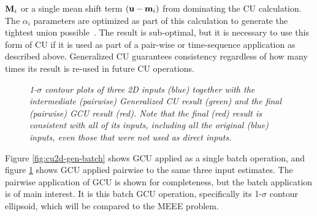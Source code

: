 $\mathbf{M}_i$ or a single mean shift term $(\mathbf{u}-\mathbf{m}_i)$ from dominating the CU calculation. The $\alpha_i$ parameters
are optimized as part of this calculation to generate the tightest union possible~\cite{fusion06}. The result is
sub-optimal, but it is necessary to use this form of CU if it is used as part of a pair-wise or time-sequence
application as described above.  Generalized CU guarantees consistency regardless of how many times its result is
re-used in future CU operations.
\begin{figure}[tbp]
    \centering
    \caption{\it 1-$\sigma$ contour plots of three 2D inputs (blue) together with the intermediate (pairwise) Generalized CU result
        (green) and the final (pairwise) GCU result (red). Note that the final (red) result is consistent with all of
        its inputs, including all the original (blue) inputs, even those that were not used as direct inputs.}
    \label{fig:cu2d-gen-s}
\end{figure}
Figure \ref{fig:cu2d-gen-batch} shows GCU applied as a single batch operation, and figure \ref{fig:cu2d-gen-s} shows GCU
applied pairwise to the same three input estimates. The pairwise application of GCU is shown for completeness, but the
batch application is of main interest. It is this batch GCU operation, specifically its 1-$\sigma$ contour ellipsoid,
which will be compared to the MEEE problem.



